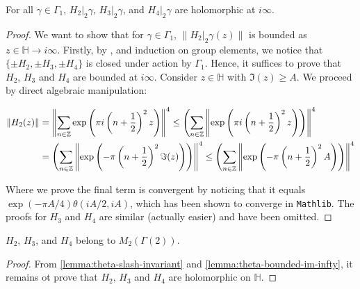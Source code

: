 \begin{lemma}\label{lemma:theta-bounded-im-infty}\leanok
  For all $\gamma \in \Gamma_1$, $H_{2}|_2 \gamma$, $H_{3}|_2 \gamma$, and $H_{4}|_2 \gamma$ are holomorphic at $i\infty$.
\end{lemma}
\begin{proof}
  We want to show that for $\gamma \in \Gamma_1$, $\|H_2|_2\gamma(z)\|$ is bounded as $z \in \mathbb{H} \to i\infty$. Firstly, by ,  and induction on group elements, we notice that $\{\pm H_2, \pm H_3, \pm H_4\}$ is closed under action by $\Gamma_1$. Hence, it suffices to prove that $H_2$, $H_3$ and $H_4$ are bounded at $i\infty$. Consider $z \in \mathbb{H}$ with $\Im(z) \geq A$. We proceed by direct algebraic manipulation:

\begin{align}
  \|H_2(z)\|
  &= \left\|\sum_{n \in \mathbb{Z}} \exp\left(\pi i \left(n + \frac{1}{2}\right)^2 z\right)\right\|^4
  \leq \left(\sum_{n \in \mathbb{Z}} \left\|\exp\left(\pi i \left(n + \frac{1}{2}\right)^2 z\right)\right)\right\|^4 \\
  &= \left(\sum_{n \in \mathbb{Z}} \left\|\exp\left(-\pi \left(n + \frac{1}{2}\right)^2 \Im(z)\right)\right)\right\|^4
  \leq \left(\sum_{n \in \mathbb{Z}} \left\|\exp\left(-\pi \left(n + \frac{1}{2}\right)^2 A\right)\right)\right\|^4
\end{align}

  Where we prove the final term is convergent by noticing that it equals $\exp(-\pi A / 4)\theta(iA / 2, iA)$, which has been shown to converge in \texttt{Mathlib}. The proofs for $H_3$ and $H_4$ are similar (actually easier) and have been omitted.

\end{proof}

\begin{lemma}\label{lemma:theta-modular}
$H_{2}$, $H_{3}$, and $H_{4}$ belong to $M_2(\Gamma(2))$.
\end{lemma}
\begin{proof}
  From \cref{lemma:theta-slash-invariant} and \cref{lemma:theta-bounded-im-infty}, it remains ot prove that $H_2$, $H_3$ and $H_4$ are holomorphic on $\mathbb{H}$. 
\end{proof}


